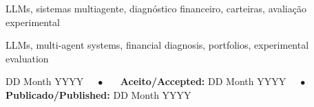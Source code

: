 \documentclass[portuguese]{sbc2025}%
\begin{document}
\begin{frontmatter}
\begin{pchaves}
LLMs, sistemas multiagente, diagnóstico financeiro, carteiras, avaliação experimental
\end{pchaves}

\begin{keywords}
LLMs, multi-agent systems, financial diagnosis, portfolios, experimental evaluation
\end{keywords}

\begin{dates}
 DD Month YYYY~~~$\bullet$~~~
{\sffamily\textbf{Aceito/Accepted:}} DD Month YYYY~~~$\bullet$~~~
{\sffamily\textbf{Publicado/Published:}} DD Month YYYY
\end{dates}



\end{frontmatter}









\end{document}
